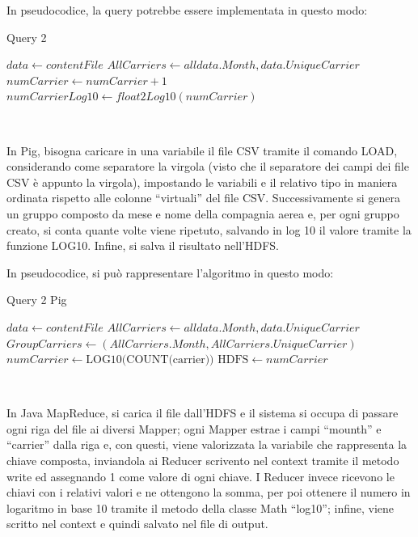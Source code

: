 \documentclass[11pt]{article} %
\begin{document}
In pseudocodice, la query potrebbe essere implementata in questo modo:

\begin{algorithm}
\caption{Query 2}\label{euclid}
\begin{algorithmic}[0]
\State $data \gets contentFile$
\State $AllCarriers \gets all data.Month, data.UniqueCarrier$
\State $numCarrier \gets numCarrier + 1$
\State $numCarrierLog10 \gets float2Log10(numCarrier)$
\EndFor
\end{algorithmic}
\end{algorithm}

~

In Pig, bisogna caricare in una variabile il file CSV tramite il comando LOAD, considerando come separatore la virgola (visto che il separatore dei campi dei file CSV è appunto la virgola), impostando le variabili e il relativo tipo in maniera ordinata rispetto alle colonne ``virtuali'' del file CSV. Successivamente si genera un gruppo composto da mese e nome della compagnia aerea e, per ogni gruppo creato, si conta quante volte viene ripetuto, salvando in log 10 il valore tramite la funzione LOG10. Infine, si salva il risultato nell'HDFS.

In pseudocodice, si può rappresentare l'algoritmo in questo modo:

\begin{algorithm}
\caption{Query 2 Pig}\label{euclid}
\begin{algorithmic}[0]
\State $data \gets contentFile$
\State $AllCarriers \gets all data.Month, data.UniqueCarrier$
\State $GroupCarriers \gets (AllCarriers.Month, AllCarriers.UniqueCarrier)$
	\State $numCarrier \gets \text{LOG10(COUNT(carrier))}$
\EndFor
\State $\text{HDFS}\gets numCarrier$
\end{algorithmic}
\end{algorithm}

~

In Java MapReduce, si carica il file dall'HDFS e il sistema si occupa di passare ogni riga del file ai diversi Mapper; ogni Mapper estrae i campi ``mounth'' e ``carrier'' dalla riga e, con questi, viene valorizzata la variabile che rappresenta la chiave composta, inviandola ai Reducer scrivento nel context tramite il metodo write ed assegnando 1 come valore di ogni chiave. I Reducer invece ricevono le chiavi con i relativi valori e ne ottengono la somma, per poi ottenere il numero in logaritmo in base 10 tramite il metodo della classe Math ``log10''; infine, viene scritto nel context e quindi salvato nel file di output.
\end{document}
